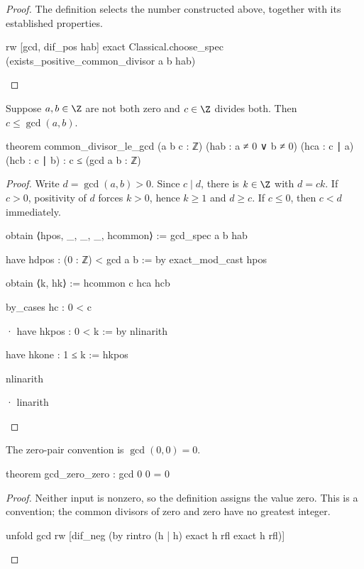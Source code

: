 \begin{proof}
  The definition selects the number constructed above, together with its established properties.

  \begin{lean}
    rw [gcd, dif_pos hab]
    exact Classical.choose_spec (exists_positive_common_divisor a b hab)
  \end{lean}
\end{proof}

\begin{theorem} \label{nt:thm:common-divisor-le-gcd}
  Suppose $a,b\in\Z$ are not both zero and $c\in\Z$ divides both. Then $c\le\gcd(a,b)$.

  \begin{lean}
    theorem common_divisor_le_gcd (a b c : ℤ) (hab : a ≠ 0 ∨ b ≠ 0)
        (hca : c ∣ a) (hcb : c ∣ b) : c ≤ (gcd a b : ℤ)
  \end{lean}
\end{theorem}

\begin{proof}
  Write $d=\gcd(a,b)>0$. Since $c\mid d$, there is $k\in\Z$ with $d=ck$. If $c>0$, positivity of $d$ forces $k>0$, hence $k\ge1$ and $d\ge c$. If $c\le0$, then $c<d$ immediately.

  \begin{lean}
    obtain ⟨hpos, _, _, _, hcommon⟩ := gcd_spec a b hab

    have hdpos : (0 : ℤ) < gcd a b := by
      exact_mod_cast hpos

    obtain ⟨k, hk⟩ := hcommon c hca hcb

    by_cases hc : 0 < c

    · have hkpos : 0 < k := by
        nlinarith

      have hkone : 1 ≤ k := hkpos

      nlinarith

    · linarith
  \end{lean}
\end{proof}

\begin{theorem} \label{nt:thm:gcd-zero-zero}
  The zero-pair convention is $\gcd(0,0)=0$.

  \begin{lean}
    theorem gcd_zero_zero : gcd 0 0 = 0
  \end{lean}
\end{theorem}

\begin{proof}
  Neither input is nonzero, so the definition assigns the value zero. This is a convention; the common divisors of zero and zero have no greatest integer.

  \begin{lean}
    unfold gcd
    rw [dif_neg (by
      rintro (h | h)
      exact h rfl
      exact h rfl)]
  \end{lean}
\end{proof}

